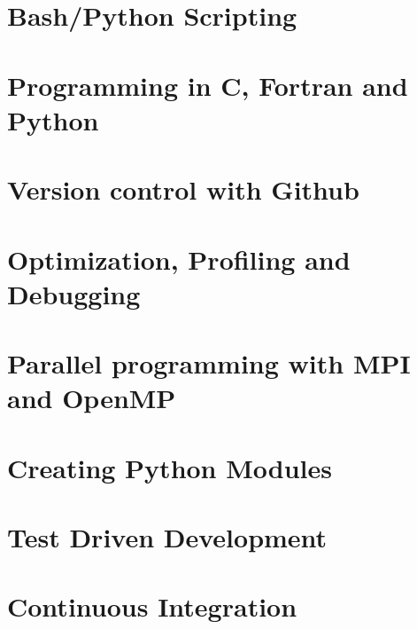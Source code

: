 \documentclass[letterpaper,twoside]{srcbook}
\begin{document}
\section{Bash/Python Scripting}
\section{Programming in C, Fortran and Python}
\section{Version control with Github}
\section{Optimization, Profiling and Debugging}
\section{Parallel programming with MPI and OpenMP}
\section{Creating Python Modules}
\section{Test Driven Development}
\section{Continuous Integration}
\end{document}
